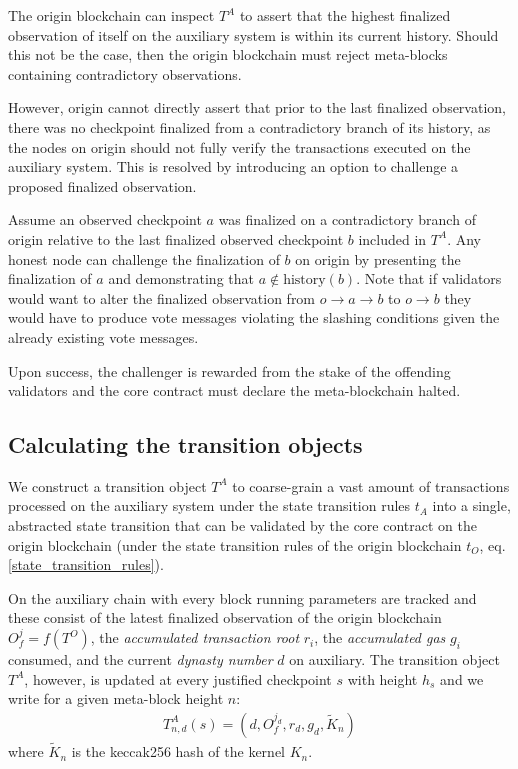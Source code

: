 \documentclass[12pt,a4paper]{article}
\begin{document}
The origin blockchain can inspect $T^A$ to assert that the highest finalized observation of itself on the auxiliary system is within its current history.
Should this not be the case, then the origin blockchain must reject meta-blocks containing contradictory observations.

However, origin cannot directly assert that prior to the last finalized observation, there was no checkpoint finalized from a contradictory branch of its history, as the nodes on origin should not fully verify the transactions executed on the auxiliary system.
This is resolved by introducing an option to challenge a proposed finalized observation.

Assume an observed checkpoint $a$ was finalized on a contradictory branch of origin relative to the last finalized observed checkpoint $b$ included in $T^A$.
Any honest node can challenge the finalization of $b$ on origin by presenting the finalization of $a$ and demonstrating that $a \notin \text{history}(b)$.
Note that if validators would want to alter the finalized observation from $o \rightarrow a \rightarrow b$ to $o \rightarrow b$ they would have to produce vote messages violating the slashing conditions given the already existing vote messages.

Upon success, the challenger is rewarded from the stake of the offending validators and the core contract must declare the meta-blockchain halted.

\subsection{Calculating the transition objects}

We construct a transition object $T^A$ to coarse-grain a vast amount of transactions processed on the auxiliary system under the state transition rules $t_A$ into a single, abstracted state transition that can be validated by the core contract on the origin blockchain (under the state transition rules of the origin blockchain $t_O$, eq. \ref{state_transition_rules}).

On the auxiliary chain with every block running parameters are tracked and these consist of the latest finalized observation of the origin blockchain $O^j_f= f(T^O)$, the \emph{accumulated transaction root} $r_i$, the \emph{accumulated gas} $g_i$ consumed, and the current \emph{dynasty number} $d$ on auxiliary.
The transition object $T^A$, however, is updated at every justified checkpoint $s$ with height $h_s$ and we write for a given meta-block height $n$:
\begin{align*}
  T^A_{n,d}(s) = (d, O^{j_d}_f, r_d, g_d, \tilde{K}_n)
\end{align*}
where $\tilde{K}_n$ is the keccak256 hash of the kernel $K_n$.
\end{document}
